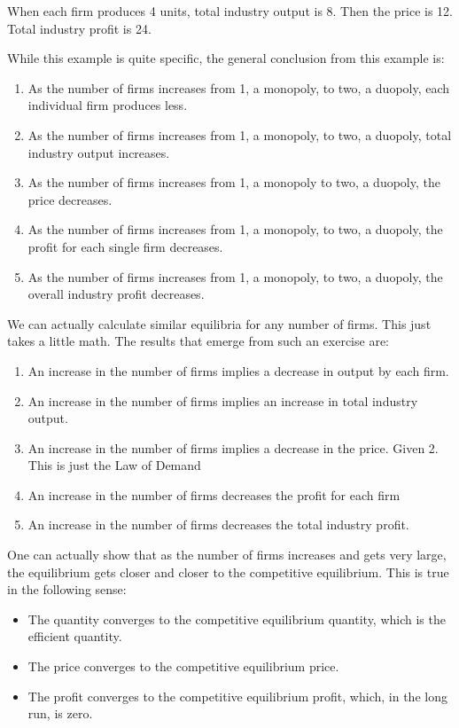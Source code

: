 \documentclass[
]{book}
\providecommand{\tightlist}{%
  \setlength{\itemsep}{0pt}\setlength{\parskip}{0pt}}
\begin{document}
When each firm produces 4 units, total industry output is 8.
Then the price is 12.
Total industry profit is 24.

While this example is quite specific, the general conclusion from this example is:

\begin{enumerate}
\def\labelenumi{\arabic{enumi}.}
\tightlist
\item
  As the number of firms increases from 1, a monopoly, to two, a duopoly, each individual firm produces less.
\item
  As the number of firms increases from 1, a monopoly, to two, a duopoly, total industry output increases.\\
\item
  As the number of firms increases from 1, a monopoly to two, a duopoly, the price decreases.
\item
  As the number of firms increases from 1, a monopoly, to two, a duopoly, the profit for each single firm decreases.
\item
  As the number of firms increases from 1, a monopoly, to two, a duopoly, the overall industry profit decreases.
\end{enumerate}

We can actually calculate similar equilibria for any number of firms. This just takes a little math. The results that emerge from such an exercise are:

\begin{enumerate}
\def\labelenumi{\arabic{enumi}.}
\tightlist
\item
  An increase in the number of firms implies a decrease in output by each firm.
\item
  An increase in the number of firms implies an increase in total industry output.
\item
  An increase in the number of firms implies a decrease in the price. Given 2. This is just the Law of Demand
\item
  An increase in the number of firms decreases the profit for each firm
\item
  An increase in the number of firms decreases the total industry profit.
\end{enumerate}

One can actually show that as the number of firms increases and gets very large, the equilibrium gets closer and closer to the competitive equilibrium. This is true in the following sense:

\begin{itemize}
\tightlist
\item
  The quantity converges to the competitive equilibrium quantity, which is the efficient quantity.
\item
  The price converges to the competitive equilibrium price.
\item
  The profit converges to the competitive equilibrium profit, which, in the long run, is zero.
\end{itemize}
\end{document}
